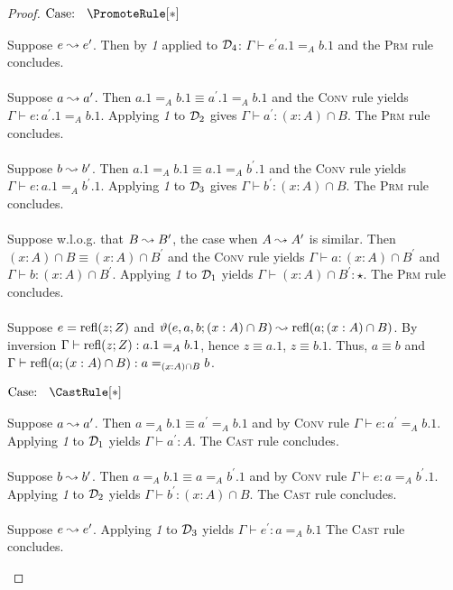 \begin{proof}
    $\text{Case: }\begin{array}{c} \PromoteRule[*] \end{array}$
    \begin{proofcase}
        Suppose $e \leadsto e^\prime$.
        Then by \textit{1} applied to $\mathcal{D}_{4}$: $\Gamma \vdash e^\prime a.1 =_A b.1$ and the \textsc{Prm} rule concludes.
        \\ \\
        Suppose $a \leadsto a^\prime$.
        Then $a.1 =_A b.1 \equiv a^\prime.1 =_A b.1$ and the \textsc{Conv} rule yields $\Gamma \vdash e : a^\prime.1 =_A b.1$.
        Applying \textit{1} to $\mathcal{D}_{2}$ gives $\Gamma \vdash a^\prime : (x : A) \cap B$.
        The \textsc{Prm} rule concludes.
        \\ \\
        Suppose $b \leadsto b^\prime$.
        Then $a.1 =_A b.1 \equiv a.1 =_A b^\prime.1$ and the \textsc{Conv} rule yields $\Gamma \vdash e : a.1 =_A b^\prime.1$.
        Applying \textit{1} to $\mathcal{D}_{3}$ gives $\Gamma \vdash b^\prime : (x : A) \cap B$.
        The \textsc{Prm} rule concludes.
        \\ \\
        Suppose w.l.o.g. that $B \leadsto B^\prime$, the case when $A \leadsto A^\prime$ is similar.
        Then $(x : A) \cap B \equiv (x : A) \cap B^\prime$ and the \textsc{Conv} rule yields $\Gamma \vdash a : (x : A) \cap B^\prime$ and $\Gamma \vdash b : (x : A) \cap B^\prime$.
        Applying \textit{1} to $\mathcal{D}_{1}$ yields $\Gamma \vdash (x : A) \cap B^\prime : \star$.
        The \textsc{Prm} rule concludes.
        \\ \\
        Suppose $e = \textnormal{refl}(z;Z)$ and $\vartheta(e, a, b; (x:A) \cap B) \leadsto \textnormal{refl}(a; (x : A) \cap B)$.
        By inversion $\Gamma \vdash \textnormal{refl}(z;Z) : a.1 =_A b.1$, hence $z \equiv a.1$, $z \equiv b.1$.
        Thus, $a \equiv b$ and $\Gamma \vdash \textnormal{refl}(a; (x : A) \cap B) : a =_{(x :A) \cap B} b$.
    \end{proofcase}

    $\text{Case: }\begin{array}{c} \CastRule[*] \end{array}$
    \begin{proofcase}
        Suppose $a \leadsto a^\prime$.
        Then $a =_A b.1 \equiv a^\prime =_A b.1$ and by \textsc{Conv} rule $\Gamma \vdash e : a^\prime =_A b.1$.
        Applying \textit{1} to $\mathcal{D}_{1}$ yields $\Gamma \vdash a^\prime : A$.
        The \textsc{Cast} rule concludes.
        \\ \\
        Suppose $b \leadsto b^\prime$.
        Then $a =_A b.1 \equiv a =_A b^\prime.1$ and by \textsc{Conv} rule $\Gamma \vdash e : a =_A b^\prime.1$.
        Applying \textit{1} to $\mathcal{D}_{2}$ yields $\Gamma \vdash b^\prime : (x : A) \cap B$.
        The \textsc{Cast} rule concludes.
        \\ \\
        Suppose $e \leadsto e^\prime$.
        Applying \textit{1} to $\mathcal{D}_{3}$ yields $\Gamma \vdash e^\prime : a =_A b.1$
        The \textsc{Cast} rule concludes.
    \end{proofcase}


\end{proof}
